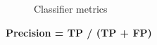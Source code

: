 \documentclass[11pt]{article}
\begin{document}
\begin{figure}[h]
\begin{center}
\end{center}
\caption{Classifier metrics}
\label{experiment1fitness}
\end{figure}

\begin{center}
\textbf{Precision = TP / (TP + FP)}
\end{center}
\end{document}
